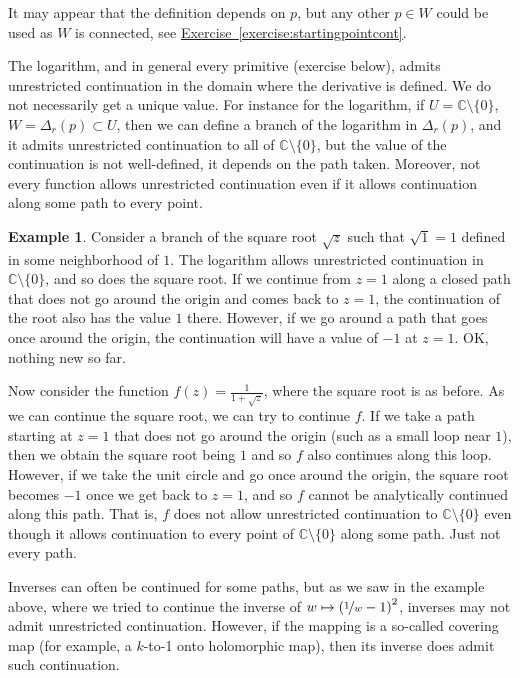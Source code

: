 \documentclass[12pt,openany]{book}
\newcommand{\C}{{\mathbb{C}}}
\theoremstyle{plain}
\theoremstyle{remark}
\theoremstyle{definition}
\theoremstyle{exercise}
\theoremstyle{example}
\newtheorem{example}[thm]{Example}
\newcommand{\exerciseref}[1]{\hyperref[#1]{Exercise~\ref*{#1}}}
\begin{document}
It may appear that the definition
depends on $p$, but any other $p \in W$ could be used as $W$ is connected,
see \exerciseref{exercise:startingpointcont}.

The logarithm, and in general every primitive (exercise below),
admits unrestricted
continuation in the domain where the derivative is defined.
We do not necessarily get a unique value.
For instance for the logarithm,
if $U = \C \setminus \{ 0 \}$, $W=\Delta_r(p) \subset U$, then we
can define a branch of the logarithm in $\Delta_r(p)$, and it admits
unrestricted continuation
to all of $\C \setminus \{ 0 \}$, but the value of the continuation
is not well-defined, it depends on the path taken.
Moreover,
not every function allows unrestricted continuation even if it allows
continuation along some path to every point.

\begin{example}
Consider a branch of the square root $\sqrt{z}$ such that $\sqrt{1}=1$
defined in some neighborhood of $1$.  The logarithm allows
unrestricted continuation in $\C \setminus \{ 0 \}$, and so does the square root.
If we continue from $z=1$ along a closed path that does not go around the origin and comes
back to $z=1$, the continuation of the root also has the value $1$ there.  However,
if we go around a path that goes once around the origin, the continuation
will have a value of $-1$ at $z=1$.  OK\@, nothing new so far.

Now consider the function $f(z) = \frac{1}{1+\sqrt{z}}$, where the square
root is as before.  As we can continue the square root, we can try to
continue $f$.  If we take a path starting at $z=1$ that does not go around the origin
(such as a small loop near $1$), then we obtain the square root being $1$
and so $f$ also continues along this loop.  However, if we take the
unit circle and go once around the origin, the square root becomes $-1$
once we get back to $z=1$,
and so $f$ cannot be analytically continued along this path.  That is, $f$
does not allow unrestricted continuation to $\C \setminus \{ 0 \}$ even
though it allows continuation to every point of $\C \setminus \{ 0 \}$
along some path.  Just not every path.
\end{example}

Inverses can often be continued for some paths, but as we saw in the
example above, where
we tried to continue the inverse of
$w \mapsto {(\nicefrac{1}{w}-1)}^2$, inverses may not admit 
unrestricted continuation.  However, if the mapping is a so-called covering
map (for example, a $k$-to-1 onto holomorphic map), then its inverse does
admit such continuation.
\end{document}
